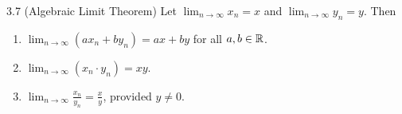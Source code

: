 \documentclass[class=article, crop=false]{standalone}
\begin{document}
  \begin{theorem}{3.7 (Algebraic Limit Theorem)}
    Let $\lim_{n\to \infty}x_n = x$ and $\lim_{n\to \infty}y_n = y$. Then
    \begin{enumerate}[label=(\roman*)]
      \item $\lim_{n\to \infty}(ax_n + by_n) = ax + by$ for all $a, b\in\mathbb{R}$.
      \item $\lim_{n\to \infty}(x_n\cdot y_n) = xy$.
      \item $\lim_{n\to \infty} \frac{x_n}{y_n} = \frac{x}{y}$, provided $y\neq 0$.
    \end{enumerate}
  \end{theorem}
\end{document}
